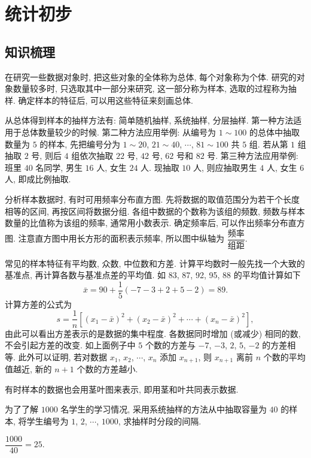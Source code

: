 
\section{统计初步}

\subsection{知识梳理}

在研究一些数据对象时, 把这些对象的全体称为总体, 每个对象称为个体. 研究的对象数量较多时, 只选取其中一部分来研究, 这一部分称为样本, 选取的过程称为抽样. 确定样本的特征后, 可以用这些特征来刻画总体.

从总体得到样本的抽样方法有: 简单随机抽样, 系统抽样, 分层抽样. 第一种方法适用于总体数量较少的时候. 第二种方法应用举例: 从编号为 $1\sim 100$ 的总体中抽取数量为 $5$ 的样本, 先把编号分为 $1\sim 20$, $21\sim 40$, $\cdots$, $81\sim 100$ 共 $5$ 组. 若从第 $1$ 组抽取 $2$ 号, 则后 $4$ 组依次抽取 $22$ 号, $42$ 号, $62$ 号和 $82$ 号. 第三种方法应用举例: 班里 $40$ 名同学, 男生 $16$ 人, 女生 $24$ 人. 现抽取 $10$ 人, 则应抽取男生 $4$ 人, 女生 $6$ 人, 即成比例抽取.

分析样本数据时, 有时可用频率分布直方图. 先将数据的取值范围分为若干个长度相等的区间, 再按区间将数据分组. 各组中数据的个数称为该组的频数, 频数与样本数量的比值称为该组的频率, 通常用小数表示. 确定频率后, 可以作出频率分布直方图. 注意直方图中用长方形的面积表示频率, 所以图中纵轴为 $\dfrac{\text{频率}}{\text{组距}}$.

常见的样本特征有平均数, 众数, 中位数和方差. 计算平均数时一般先找一个大致的基准点, 再计算各数与基准点差的平均值. 如 83, 87, 92, 95, 88 的平均值计算如下
\[\bar{x}= 90+\frac15(-7-3+2+5-2)= 89.\]
计算方差的公式为
\[s= \frac1n[(x_1-\bar{x})^2+(x_2-\bar{x})^2+\cdots
     + (x_n-\bar{x})^2],\]
由此可以看出方差表示的是数据的集中程度. 各数据同时增加 (或减少) 相同的数, 不会引起方差的改变. 如上面例子中 $5$ 个数的方差与 $-7$, $-3$, $2$, $5$, $-2$ 的方差相等. 此外可以证明, 若对数据 $x_1$, $x_2$, $\cdots$, $x_n$ 添加 $x_{n+1}$, 则 $x_{n+1}$ 离前 $n$ 个数的平均值越近, 新的 $n+1$ 个数的方差越小. 

有时样本的数据也会用茎叶图来表示, 即用茎和叶共同表示数据.

\lianxi
\begin{exercise}
    为了了解 $1000$ 名学生的学习情况, 采用系统抽样的方法从中抽取容量为 $40$ 的样本, 将学生编号为 $1$, $2$, $\cdots$, $1000$, 求抽样时分段的间隔.
\end{exercise}
\beginsolution
    $\dfrac{1000}{40}= 25$.
\endsolution

